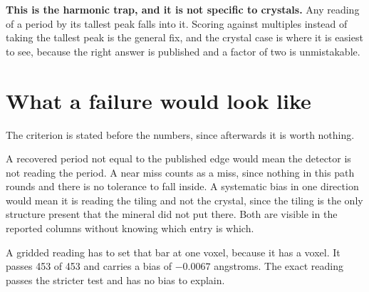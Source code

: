\textbf{This is the harmonic trap, and it is not specific to crystals.} Any reading of a period by its tallest peak falls into it. Scoring against multiples instead of taking the tallest peak is the general fix, and the crystal case is where it is easiest to see, because the right answer is published and a factor of two is unmistakable.

\section{What a failure would look like}

The criterion is stated before the numbers, since afterwards it is worth nothing.

A recovered period not equal to the published edge would mean the detector is not reading the period. A near miss counts as a miss, since nothing in this path rounds and there is no tolerance to fall inside. A systematic bias in one direction would mean it is reading the tiling and not the crystal, since the tiling is the only structure present that the mineral did not put there. Both are visible in the reported columns without knowing which entry is which.

A gridded reading has to set that bar at one voxel, because it has a voxel. It passes 453 of 453 and carries a bias of $-0.0067$ angstroms. The exact reading passes the stricter test and has no bias to explain.
